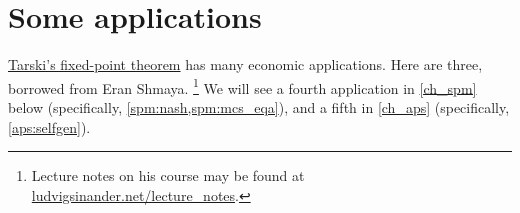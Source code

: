 \section{Some applications}
\label{tar:app}

\hyperref[theorem:tarski]{Tarski's fixed-point theorem} has many economic applications. Here are three, borrowed from Eran Shmaya.%
	\footnote{Lecture notes on his course may be found at \href{https://ludvigsinander.net/lecture_notes.html}{ludvigsinander.net/lecture\_notes}.}
We will see a fourth application in \cref{ch_spm} below (specifically, \cref{spm:nash,spm:mcs_eqa}), and a fifth in \cref{ch_aps} (specifically, \cref{aps:selfgen}).

